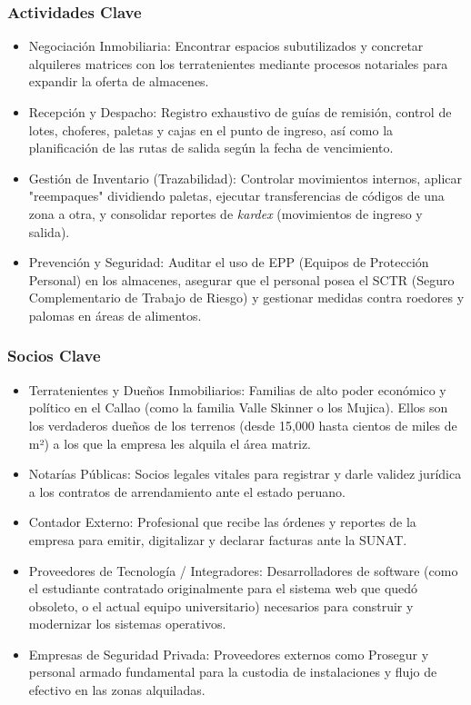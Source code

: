 \documentclass[11pt]{article}
\begin{document}
\subsubsection{Actividades Clave}

\begin{itemize}
\item
  Negociación Inmobiliaria: Encontrar espacios subutilizados y concretar
  alquileres matrices con los terratenientes mediante procesos
  notariales para expandir la oferta de almacenes.
\item
  Recepción y Despacho: Registro exhaustivo de guías de remisión,
  control de lotes, choferes, paletas y cajas en el punto de ingreso,
  así como la planificación de las rutas de salida según la fecha de
  vencimiento.
\item
  Gestión de Inventario (Trazabilidad): Controlar movimientos internos,
  aplicar "reempaques" dividiendo paletas, ejecutar transferencias de
  códigos de una zona a otra, y consolidar reportes de \emph{kardex}
  (movimientos de ingreso y salida).
\item
  Prevención y Seguridad: Auditar el uso de EPP (Equipos de Protección
  Personal) en los almacenes, asegurar que el personal posea el SCTR
  (Seguro Complementario de Trabajo de Riesgo) y gestionar medidas
  contra roedores y palomas en áreas de alimentos.
\end{itemize}

\subsubsection{Socios Clave}

\begin{itemize}
\item
  Terratenientes y Dueños Inmobiliarios: Familias de alto poder
  económico y político en el Callao (como la familia Valle Skinner o los
  Mujica). Ellos son los verdaderos dueños de los terrenos (desde 15,000
  hasta cientos de miles de m²) a los que la empresa les alquila el área
  matriz.
\item
  Notarías Públicas: Socios legales vitales para registrar y darle
  validez jurídica a los contratos de arrendamiento ante el estado
  peruano.
\item
  Contador Externo: Profesional que recibe las órdenes y reportes de la
  empresa para emitir, digitalizar y declarar facturas ante la SUNAT.
\item
  Proveedores de Tecnología / Integradores: Desarrolladores de software
  (como el estudiante contratado originalmente para el sistema web que
  quedó obsoleto, o el actual equipo universitario) necesarios para
  construir y modernizar los sistemas operativos.
\item
  Empresas de Seguridad Privada: Proveedores externos como Prosegur y
  personal armado fundamental para la custodia de instalaciones y flujo
  de efectivo en las zonas alquiladas.
\end{itemize}
\end{document}
